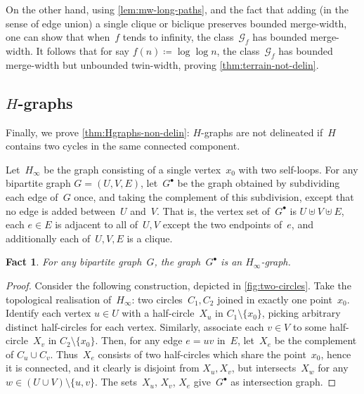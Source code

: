 \documentclass[a4paper,UKenglish,cleveref,thm-restate]{lipics-v2021}
\newtheorem{fact}[theorem]{Fact}
\theoremstyle{remark}
\newcommand{\eqdef}{\coloneqq}
\newcommand{\Gc}{\mathcal{G}}
\begin{document}
On the other hand, using \cref{lem:mw-long-paths}, and the fact that adding (in the sense of edge union) a single clique or biclique preserves bounded merge-width,
one can show that when~$f$ tends to infinity, the class~$\Gc_f$ has bounded merge-width.
It follows that for say $f(n) \eqdef \log \log n$, the class~$\Gc_f$ has bounded merge-width but unbounded twin-width, proving \cref{thm:terrain-not-delin}.


\subsection[H-graphs]{$H$-graphs}
Finally, we prove \cref{thm:Hgraphs-non-delin}: $H$-graphs are not delineated if~$H$ contains two cycles in the same connected component.

Let~$H_\infty$ be the graph consisting of a single vertex~$x_0$ with two self-loops.
For any bipartite graph $G = (U,V,E)$, let~$G^\bullet$ be the graph obtained by subdividing each edge of~$G$ once, and taking the complement of this subdivision, except that no edge is added between~$U$ and~$V$.
That is, the vertex set of~$G^\bullet$ is $U \uplus V \uplus E$, each $e \in E$ is adjacent to all of~$U,V$ except the two endpoints of~$e$,
and additionally each of~$U,V,E$ is a clique.
\begin{fact}
    For any bipartite graph~$G$, the graph~$G^\bullet$ is an $H_\infty$-graph.
\end{fact}
\begin{proof}
    Consider the following construction, depicted in \cref{fig:two-circles}.
    Take the topological realisation of~$H_\infty$: two circles~$C_1,C_2$ joined in exactly one point~$x_0$.
    Identify each vertex $u \in U$ with a half-circle~$X_u$ in $C_1 \setminus \{x_0\}$, picking arbitrary distinct half-circles for each vertex.
    Similarly, associate each $v \in V$ to some half-circle~$X_v$ in $C_2 \setminus \{x_0\}$.
    Then, for any edge $e = uv$ in~$E$, let~$X_e$ be the complement of $C_u \cup C_v$.
    Thus~$X_e$ consists of two half-circles which share the point~$x_0$, hence it is connected,
    and it clearly is disjoint from $X_u,X_v$, but intersects~$X_w$ for any $w \in (U \cup V) \setminus \{u,v\}$.
    The sets~$X_u$, $X_v$, $X_e$ give~$G^\bullet$ as intersection graph.
\end{proof}
\end{document}
